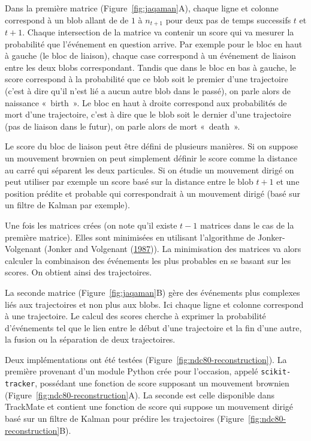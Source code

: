 \documentclass[12pt,a4paper,twoside,openright]{book}
\begin{document}
Dans la première matrice (Figure~\ref{fig:jaqaman}A), chaque ligne et
colonne correspond à un blob allant de de \(1\) à \(n_{t+1}\) pour deux
pas de temps successifs \(t\) et \(t+1\). Chaque intersection de la
matrice va contenir un score qui va mesurer la probabilité que
l'événement en question arrive. Par exemple pour le bloc en haut à
gauche (le bloc de liaison), chaque case correspond à un événement de
liaison entre les deux blobs correspondant. Tandis que dans le bloc en
bas à gauche, le score correspond à la probabilité que ce blob soit le
premier d'une trajectoire (c'est à dire qu'il n'est lié a aucun autre
blob dans le passé), on parle alors de naissance «~birth~». Le bloc en
haut à droite correspond aux probabilités de mort d'une trajectoire,
c'est à dire que le blob soit le dernier d'une trajectoire (pas de
liaison dans le futur), on parle alors de mort «~death~».

Le score du bloc de liaison peut être défini de plusieurs manières. Si
on suppose un mouvement brownien on peut simplement définir le score
comme la distance au carré qui séparent les deux particules. Si on
étudie un mouvement dirigé on peut utiliser par exemple un score basé
sur la distance entre le blob \(t+1\) et une position prédite et
probable qui correspondrait à un mouvement dirigé (basé sur un filtre de
Kalman par exemple).

Une fois les matrices crées (on note qu'il existe \(t-1\) matrices dans
le cas de la première matrice). Elles sont minimisées en utilisant
l'algorithme de Jonker-Volgenant (Jonker and Volgenant
(\protect\hyperlink{ref-Jonker1987}{1987})). La minimisation des
matrices va alors calculer la combinaison des événements les plus
probables en se basant sur les scores. On obtient ainsi des
trajectoires.

La seconde matrice (Figure~\ref{fig:jaqaman}B) gère des événements plus
complexes liés aux trajectoires et non plus aux blobs. Ici chaque ligne
et colonne correspond à une trajectoire. Le calcul des scores cherche à
exprimer la probabilité d'événements tel que le lien entre le début
d'une trajectoire et la fin d'une autre, la fusion ou la séparation de
deux trajectoires.

Deux implémentations ont été testées
(Figure~\ref{fig:ndc80-reconstruction}). La première provenant d'un
module Python crée pour l'occasion, appelé \texttt{scikit-tracker},
possédant une fonction de score supposant un mouvement brownien
(Figure~\ref{fig:ndc80-reconstruction}A). La seconde est celle
disponible dans TrackMate et contient une fonction de score qui suppose
un mouvement dirigé basé sur un filtre de Kalman pour prédire les
trajectoires (Figure~\ref{fig:ndc80-reconstruction}B).
\end{document}
